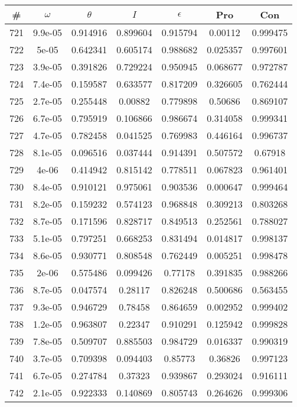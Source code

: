 \newpage
\begin{table}
\begin{tabular}{c|c|c|c|c|c|c}
\# & $\omega$ & $\theta$ & $I$ & $\epsilon$ & Pro & Con\\
\hline
721 & 9.9e-05 & 0.914916 & 0.899604 & 0.915794 & 0.00112 & 0.999475\\
722 & 5e-05 & 0.642341 & 0.605174 & 0.988682 & 0.025357 & 0.997601\\
723 & 3.9e-05 & 0.391826 & 0.729224 & 0.950945 & 0.068677 & 0.972787\\
724 & 7.4e-05 & 0.159587 & 0.633577 & 0.817209 & 0.326605 & 0.762444\\
725 & 2.7e-05 & 0.255448 & 0.00882 & 0.779898 & 0.50686 & 0.869107\\
726 & 6.7e-05 & 0.795919 & 0.106866 & 0.986674 & 0.314058 & 0.999341\\
727 & 4.7e-05 & 0.782458 & 0.041525 & 0.769983 & 0.446164 & 0.996737\\
728 & 8.1e-05 & 0.096516 & 0.037444 & 0.914391 & 0.507572 & 0.67918\\
729 & 4e-06 & 0.414942 & 0.815142 & 0.778511 & 0.067823 & 0.961401\\
730 & 8.4e-05 & 0.910121 & 0.975061 & 0.903536 & 0.000647 & 0.999464\\
731 & 8.2e-05 & 0.159232 & 0.574123 & 0.968848 & 0.309213 & 0.803268\\
732 & 8.7e-05 & 0.171596 & 0.828717 & 0.849513 & 0.252561 & 0.788027\\
733 & 5.1e-05 & 0.797251 & 0.668253 & 0.831494 & 0.014817 & 0.998137\\
734 & 8.6e-05 & 0.930771 & 0.808548 & 0.762449 & 0.005251 & 0.998478\\
735 & 2e-06 & 0.575486 & 0.099426 & 0.77178 & 0.391835 & 0.988266\\
736 & 8.7e-05 & 0.047574 & 0.28117 & 0.826248 & 0.500686 & 0.563455\\
737 & 9.3e-05 & 0.946729 & 0.78458 & 0.864659 & 0.002952 & 0.999402\\
738 & 1.2e-05 & 0.963807 & 0.22347 & 0.910291 & 0.125942 & 0.999828\\
739 & 7.8e-05 & 0.509707 & 0.885503 & 0.984729 & 0.016337 & 0.990319\\
740 & 3.7e-05 & 0.709398 & 0.094403 & 0.85773 & 0.36826 & 0.997123\\
741 & 6.7e-05 & 0.274784 & 0.37323 & 0.939867 & 0.293024 & 0.916111\\
742 & 2.1e-05 & 0.922333 & 0.140869 & 0.805743 & 0.264626 & 0.999306\\

\end{tabular}
\end{table}
